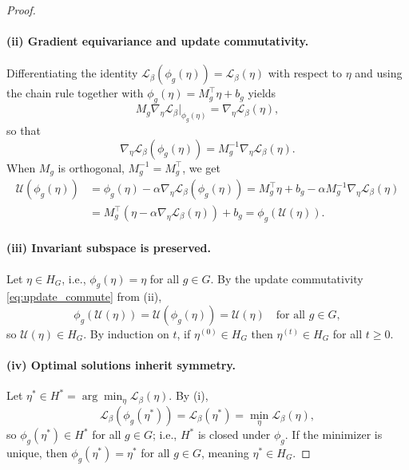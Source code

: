 \documentclass{article}
\begin{document}
\begin{proof}
    \paragraph{(ii) Gradient equivariance and update commutativity.} Differentiating the identity $\mathcal{L}_{\beta}(\phi_{g}(\eta)) = \mathcal{L}_{\beta}(\eta)$ with respect to $\eta$ and using the chain rule together with $\phi_{g}(\eta) = M_{g}^\top\eta + b_{g}$ yields
    \begin{equation}
        M_{g} \nabla_{\eta} \mathcal{L}_{\beta}\big|_{\phi_{g}(\eta)} = \nabla_{\eta} \mathcal{L}_{\beta}(\eta),
    \end{equation}
    so that
    \begin{equation}
        \nabla_{\eta} \mathcal{L}_{\beta}(\phi_{g}(\eta)) = M_{g}^{-1} \nabla_{\eta} \mathcal{L}_{\beta}(\eta).
    \end{equation}
    When $M_{g}$ is orthogonal, $M_{g}^{-1} = M_{g}^\top$, we get
    \begin{align}
        \mathcal{U}(\phi_{g}(\eta)) &= \phi_{g}(\eta) - \alpha \nabla_{\eta} \mathcal{L}_{\beta}(\phi_{g}(\eta)) = M_{g}^\top \eta + b_{g} - \alpha M_{g}^{-1} \nabla_{\eta} \mathcal{L}_{\beta}(\eta) \\
        &= M_{g}^\top (\eta - \alpha \nabla_{\eta} \mathcal{L}_{\beta}(\eta)) + b_{g} = \phi_{g}(\mathcal{U}(\eta)).
    \end{align}

    \paragraph{(iii) Invariant subspace is preserved.} Let $\eta \in H_{G}$, i.e., $\phi_{g}(\eta) = \eta$ for all $g \in G$. By the update commutativity \eqref{eq:update_commute} from (ii),
    \begin{equation}
        \phi_{g}(\mathcal{U}(\eta)) = \mathcal{U}(\phi_{g}(\eta)) = \mathcal{U}(\eta)
        \quad \text{for all } g \in G,
    \end{equation}
    so $\mathcal{U}(\eta) \in H_{G}$. By induction on $t$, if $\eta^{(0)} \in H_{G}$ then $\eta^{(t)} \in H_{G}$ for all $t \geq 0$.

    \paragraph{(iv) Optimal solutions inherit symmetry.} Let $\eta^{\ast} \in H^{\ast} = \arg\min_{\eta} \mathcal{L}_{\beta}(\eta)$. By (i),
    \begin{equation}
        \mathcal{L}_{\beta}(\phi_{g}(\eta^{\ast})) = \mathcal{L}_{\beta}(\eta^{\ast}) = \min_{\eta} \mathcal{L}_{\beta}(\eta),
    \end{equation}
    so $\phi_{g}(\eta^{\ast}) \in H^{\ast}$ for all $g \in G$; i.e., $H^{\ast}$ is closed under $\phi_{g}$. If the minimizer is unique, then $\phi_{g}(\eta^{\ast}) = \eta^{\ast}$ for all $g \in G$, meaning $\eta^{\ast} \in H_{G}$.
\end{proof}
\end{document}
